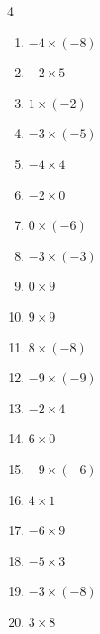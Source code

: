 \begin{multicols}{4}
\begin{enumerate}
  \item $-4\times (-8)$
        \phantom{$=32$}

  \item $-2\times 5$
        \phantom{$=-10$}

  \item $1\times (-2)$
        \phantom{$=-2$}

  \item $-3\times (-5)$
        \phantom{$=15$}

  \item $-4\times 4$
        \phantom{$=-16$}

  \item $-2\times 0$
        \phantom{$=0$}

  \item $0\times (-6)$
        \phantom{$=0$}

  \item $-3\times (-3)$
        \phantom{$=9$}

  \item $0\times 9$
        \phantom{$=0$}

  \item $9\times 9$
        \phantom{$=81$}

  \item $8\times (-8)$
        \phantom{$=-64$}

  \item $-9\times (-9)$
        \phantom{$=81$}

  \item $-2\times 4$
        \phantom{$=-8$}

  \item $6\times 0$
        \phantom{$=0$}

\columnbreak %

\resetques

  \item $-9\times (-6)$
        \phantom{$=54$}

  \item $4\times 1$
        \phantom{$=4$}

  \item $-6\times 9$
        \phantom{$=-54$}

  \item $-5\times 3$
        \phantom{$=-15$}

  \item $-3\times (-8)$
        \phantom{$=24$}

  \item $3\times 8$
        \phantom{$=24$}


\end{enumerate}
\end{multicols}
